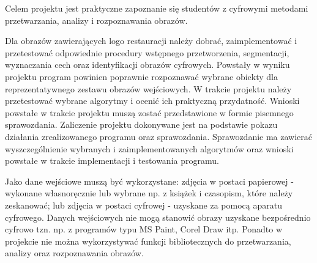 Celem projektu jest praktyczne zapoznanie się studentów z cyfrowymi metodami przetwarzania, analizy i rozpoznawania obrazów. 

Dla obrazów zawierających logo restauracji \bk należy dobrać, zaimplementować i przetestować odpowiednie procedury wstępnego przetworzenia, segmentacji, wyznaczania cech oraz identyfikacji obrazów cyfrowych. Powstały w wyniku projektu program powinien poprawnie rozpoznawać wybrane obiekty dla reprezentatywnego zestawu obrazów wejściowych. W trakcie projektu należy przetestować wybrane algorytmy i ocenić ich praktyczną przydatność. Wnioski powstałe w trakcie projektu muszą zostać przedstawione w formie pisemnego sprawozdania. Zaliczenie projektu dokonywane jest na podstawie pokazu działania zrealizowanego programu oraz sprawozdania. Sprawozdanie ma zawierać wyszczególnienie wybranych i zaimplementowanych algorytmów oraz wnioski powstałe w trakcie implementacji i testowania programu.

Jako dane wejściowe muszą być wykorzystane: zdjęcia w postaci papierowej - wykonane własnoręcznie lub wybrane np. z książek i czasopism, które należy zeskanować; lub zdjęcia w postaci cyfrowej - uzyskane za pomocą aparatu cyfrowego. Danych wejściowych nie mogą stanowić obrazy uzyskane bezpośrednio cyfrowo tzn. np. z programów typu MS Paint, Corel Draw itp. Ponadto w projekcie nie można wykorzystywać funkcji bibliotecznych do przetwarzania, analizy oraz rozpoznawania obrazów.
